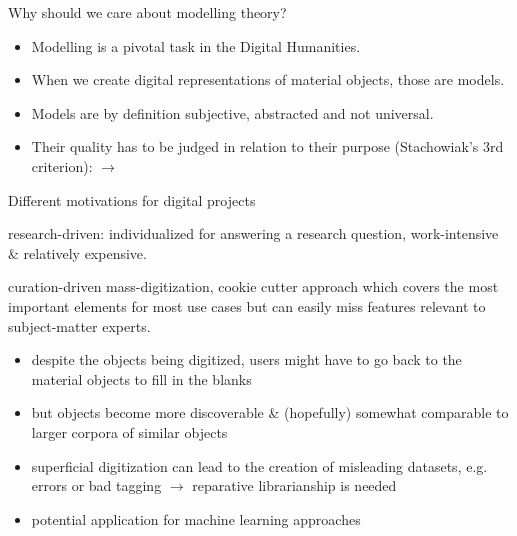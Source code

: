 \begin{frame}{Why should we care about modelling theory?}
    \begin{itemize}
        \item Modelling is a pivotal task in the Digital Humanities.
        \item When we create digital representations of material objects, those are models. 
        \item Models are by definition subjective, abstracted and not universal. 
        \item Their quality has to be judged in relation to their purpose (Stachowiak's 3rd criterion): $\to$
    \end{itemize}
\end{frame}


    \begin{frame}{Different motivations for digital projects}
    \begin{block}{research-driven:}\small
        individualized for answering a research question, work-intensive \& relatively expensive.
    \end{block}

    \begin{block}{curation-driven}\small
        mass-digitization, cookie cutter approach which covers the most important elements for most use cases but can easily miss features relevant to subject-matter experts.
            \begin{itemize}\footnotesize
                \item despite the objects being digitized, users might have to go back to the material objects to fill in the blanks
                \item but objects become more discoverable \& (hopefully) somewhat comparable to larger corpora of similar objects
                \item superficial digitization can lead to the creation of misleading datasets, e.g. errors or bad tagging $\to$ \alert{reparative librarianship} is needed
                \item potential application for machine learning approaches
            \end{itemize}
    \end{block}

\end{frame}


